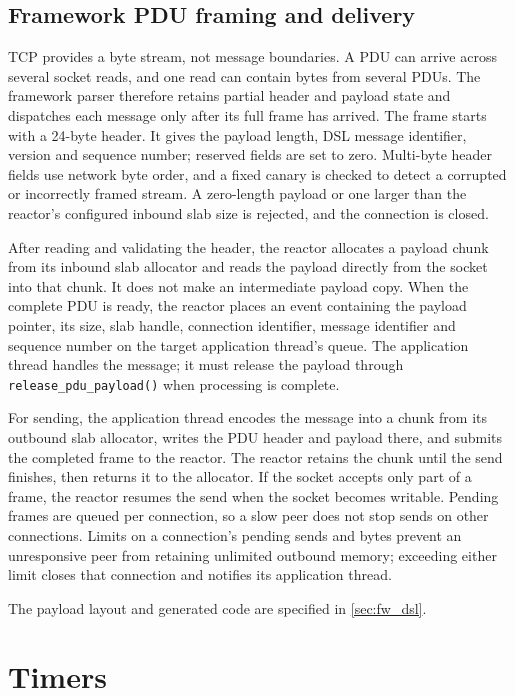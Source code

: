\subsection{Framework PDU framing and delivery}

TCP provides a byte stream, not message boundaries. A PDU can arrive across
several socket reads, and one read can contain bytes from several PDUs. The
framework parser therefore retains partial header and payload state and
dispatches each message only after its full frame has arrived. The frame
starts with a 24-byte header. It gives the payload length, DSL message
identifier, version and sequence number; reserved fields are set to zero.
Multi-byte header fields use network byte order, and a fixed canary is checked
to detect a corrupted or incorrectly framed stream. A zero-length payload or
one larger than the reactor's configured inbound slab size is rejected, and
the connection is closed.

After reading and validating the header, the reactor allocates a payload chunk
from its inbound slab allocator and reads the payload directly from the socket
into that chunk. It does not make an intermediate payload copy. When the
complete PDU is ready, the reactor places an event containing the payload
pointer, its size, slab handle, connection identifier, message identifier and
sequence number on the target application thread's queue. The application
thread handles the message; it must release the payload through
\texttt{release\_pdu\_payload()} when processing is complete.

For sending, the application thread encodes the message into a chunk from its
outbound slab allocator, writes the PDU header and payload there, and submits
the completed frame to the reactor. The reactor retains the chunk until the
send finishes, then returns it to the allocator. If the socket accepts only
part of a frame, the reactor resumes the send when the socket becomes
writable. Pending frames are queued per connection, so a slow peer does not
stop sends on other connections. Limits on a connection's pending sends and
bytes prevent an unresponsive peer from retaining unlimited outbound memory;
exceeding either limit closes that connection and notifies its application
thread.

The payload layout and generated code are specified in
\cref{sec:fw_dsl}.

\section{Timers}
\label{sec:fw_timers}

